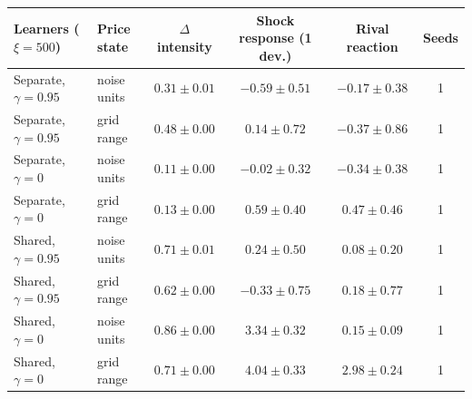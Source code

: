 \begin{tabular}{llcccc}
\toprule
Learners ($\xi=500$) & Price state & $\Delta$ intensity & Shock response (1 dev.) & Rival reaction & Seeds \\
\midrule
Separate, $\gamma=0.95$ & noise units & $0.31 \pm 0.01$ & $-0.59 \pm 0.51$ & $-0.17 \pm 0.38$ & 1 \\
Separate, $\gamma=0.95$ & grid range & $0.48 \pm 0.00$ & $0.14 \pm 0.72$ & $-0.37 \pm 0.86$ & 1 \\
Separate, $\gamma=0$ & noise units & $0.11 \pm 0.00$ & $-0.02 \pm 0.32$ & $-0.34 \pm 0.38$ & 1 \\
Separate, $\gamma=0$ & grid range & $0.13 \pm 0.00$ & $0.59 \pm 0.40$ & $0.47 \pm 0.46$ & 1 \\
Shared, $\gamma=0.95$ & noise units & $0.71 \pm 0.01$ & $0.24 \pm 0.50$ & $0.08 \pm 0.20$ & 1 \\
Shared, $\gamma=0.95$ & grid range & $0.62 \pm 0.00$ & $-0.33 \pm 0.75$ & $0.18 \pm 0.77$ & 1 \\
Shared, $\gamma=0$ & noise units & $0.86 \pm 0.00$ & $3.34 \pm 0.32$ & $0.15 \pm 0.09$ & 1 \\
Shared, $\gamma=0$ & grid range & $0.71 \pm 0.00$ & $4.04 \pm 0.33$ & $2.98 \pm 0.24$ & 1 \\
\bottomrule
\end{tabular}